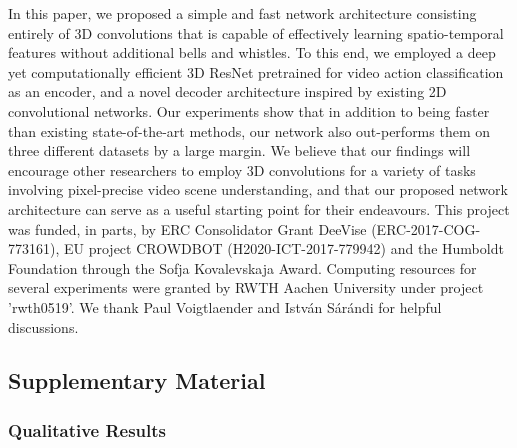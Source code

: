 \documentclass{bmvc2k}
\newcommand{\PAR}[1]{\vskip4pt \noindent {\bf #1~}}
\begin{document}
In this paper, we proposed a simple and fast network architecture consisting entirely of 3D convolutions that is capable of effectively learning spatio-temporal features without additional bells and whistles. To this end, we employed a deep yet computationally efficient 3D ResNet pretrained for video action classification as an encoder, and a novel decoder architecture inspired by existing 2D convolutional networks. 
Our experiments show that in addition to being faster than existing state-of-the-art methods, our network also out-performs them on three different datasets by a large margin. 
We believe that our findings will encourage other researchers to employ 3D convolutions for a variety of tasks involving pixel-precise video scene understanding, and that our proposed network architecture can serve as a useful starting point for their endeavours. 
\PAR{Acknowledgements.}
This project was funded, in parts, by ERC Consolidator Grant DeeVise (ERC-2017-COG-773161), EU project CROWDBOT
(H2020-ICT-2017-779942) and the Humboldt Foundation through the Sofja Kovalevskaja
Award. Computing resources for several experiments were granted by RWTH Aachen University under project 'rwth0519'. We thank Paul Voigtlaender and Istv{\'a}n S{\'a}r{\'a}ndi for helpful discussions.

\clearpage


\clearpage
\appendix
\textcolor{bmv@sectioncolor}{\vspace{-1.2cm} \part*{Supplementary Material}}
\section{Qualitative Results}
\end{document}
